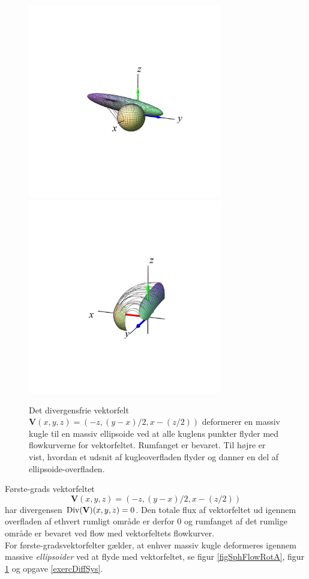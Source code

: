 \begin{figure}[ht]
\centerline{\includegraphics[width=85mm]{FIGS/plotSphFlowRot4}\includegraphics[width=85mm]{FIGS/plotSphPartFlowRot}}
\begin{center}
\caption{\small{Det divergensfrie vektorfelt $\mathbf{V}(x,y,z) = (-z, (y-x)/2, x-(z/2))$ deformerer en massiv kugle til en massiv ellipsoide ved at alle kuglens punkter flyder med  flowkurverne for vektorfeltet. Rumfanget er bevaret. Til højre er vist, hvordan et udsnit af kugleoverfladen flyder og danner en del af ellipsoide-overfladen.}} \label{figSphFlowRotB}
\end{center}
\end{figure}

\begin{example}\label{exampFirstDiv0}
Første-grads vektorfeltet
\begin{equation}
\mathbf{V}(x,y,z) =  (-z, (y-x)/2, x-(z/2))
\end{equation}
har divergensen $\operatorname{Div}(\mathbf{V})(x,y,z) = 0$. Den totale flux af vektorfeltet ud igennem overfladen af ethvert rumligt område er derfor $0$ og rumfanget af det rumlige område er bevaret ved flow med vektorfeltets flowkurver. \\

For første-gradsvektorfelter gælder, at enhver massiv kugle deformeres igennem massive \emph{ellipsoider} ved at flyde med vektorfeltet, se figur \ref{figSphFlowRotA}, figur \ref{figSphFlowRotB} og opgave \ref{exercDiffSys}.
\end{example}

